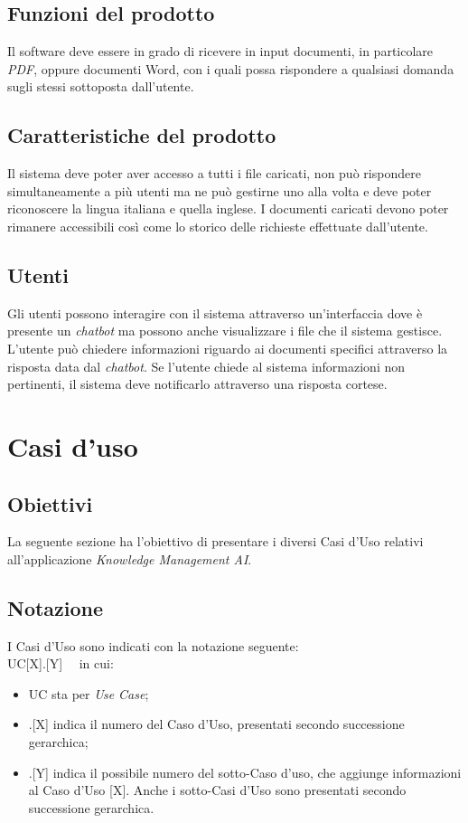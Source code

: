 \documentclass[10pt, a4paper]{article}
\begin{document}
\subsection{Funzioni del prodotto}
Il software deve essere in grado di ricevere in input documenti, in particolare \textit{PDF}, oppure documenti Word, con i quali possa rispondere a qualsiasi domanda sugli stessi sottoposta dall'utente. 
\subsection{Caratteristiche del prodotto}
Il sistema deve poter aver accesso a tutti i file caricati, non può rispondere simultaneamente a più utenti ma ne può gestirne uno alla volta e deve poter riconoscere la lingua italiana e quella inglese. I documenti caricati devono poter rimanere accessibili così come lo storico delle richieste effettuate dall'utente.
\subsection{Utenti}
Gli utenti possono interagire con il sistema attraverso un'interfaccia dove è presente un \textit{chatbot} ma possono anche visualizzare i file che il sistema gestisce. L'utente può chiedere informazioni riguardo ai documenti specifici attraverso la risposta data dal \textit{chatbot}. Se l'utente chiede al sistema informazioni non pertinenti, il sistema deve notificarlo attraverso una risposta cortese.
\newpage
\section{Casi d'uso}

\subsection{Obiettivi}
La seguente sezione ha l'obiettivo di presentare i diversi Casi d'Uso relativi all'applicazione \textit{Knowledge Management AI}. 
\subsection{Notazione} 
I Casi d'Uso sono indicati con la notazione seguente: \\ UC[X].[Y] \ \  in cui:
\begin{itemize}
\item UC sta per \textit{Use Case};
\item .[X] indica il numero del Caso d'Uso, presentati secondo successione gerarchica;
\item .[Y] indica il possibile numero del sotto-Caso d'uso, che aggiunge informazioni al Caso d'Uso [X]. Anche i sotto-Casi d'Uso sono presentati secondo successione gerarchica.
\end{itemize}
\end{document}
